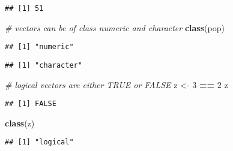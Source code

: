 \documentclass[]{article}
\newenvironment{Shaded}{\begin{snugshade}}{\end{snugshade}}
\newcommand{\CommentTok}[1]{\textcolor[rgb]{0.56,0.35,0.01}{\textit{#1}}}
\newcommand{\DecValTok}[1]{\textcolor[rgb]{0.00,0.00,0.81}{#1}}
\newcommand{\KeywordTok}[1]{\textcolor[rgb]{0.13,0.29,0.53}{\textbf{#1}}}
\newcommand{\NormalTok}[1]{#1}
\newcommand{\OperatorTok}[1]{\textcolor[rgb]{0.81,0.36,0.00}{\textbf{#1}}}
\newcommand{\StringTok}[1]{\textcolor[rgb]{0.31,0.60,0.02}{#1}}
\begin{document}
\begin{verbatim}
## [1] 51
\end{verbatim}

\begin{Shaded}
\begin{Highlighting}[]
\CommentTok{# vectors can be of class numeric and character}
\KeywordTok{class}\NormalTok{(pop)}
\end{Highlighting}
\end{Shaded}

\begin{verbatim}
## [1] "numeric"
\end{verbatim}

\begin{Shaded}
\end{Shaded}

\begin{verbatim}
## [1] "character"
\end{verbatim}

\begin{Shaded}
\begin{Highlighting}[]
\CommentTok{# logical vectors are either TRUE or FALSE}
\NormalTok{z <-}\StringTok{ }\DecValTok{3} \OperatorTok{==}\StringTok{ }\DecValTok{2}
\NormalTok{z}
\end{Highlighting}
\end{Shaded}

\begin{verbatim}
## [1] FALSE
\end{verbatim}

\begin{Shaded}
\begin{Highlighting}[]
\KeywordTok{class}\NormalTok{(z)}
\end{Highlighting}
\end{Shaded}

\begin{verbatim}
## [1] "logical"
\end{verbatim}

\begin{Shaded}
\end{Shaded}
\end{document}
